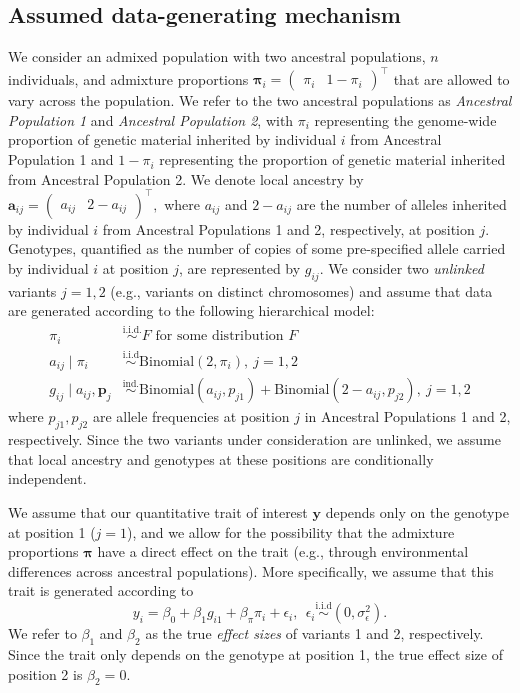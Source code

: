 \documentclass[12pt]{article}
\begin{document}
\subsection{Assumed data-generating mechanism}
\label{sec:datagen}

We consider an admixed population with two ancestral populations, $n$ individuals, and admixture proportions $\boldsymbol{\pi}_i = \begin{pmatrix} \pi_{i} & 1-\pi_{i} \end{pmatrix}^\top$ that are allowed to vary across the population. 
We refer to the two ancestral populations as \textit{Ancestral Population 1} and \textit{Ancestral Population 2}, with $\pi_i$ representing the genome-wide proportion of genetic material inherited by individual $i$ from Ancestral Population 1 and $1-\pi_i$ representing the proportion of genetic material inherited from Ancestral Population 2. 
We denote local ancestry by $\mathbf{a}_{ij} = \begin{pmatrix} a_{ij} & 2 - a_{ij} \end{pmatrix}^\top,$ where $a_{ij}$ and $2-a_{ij}$ are the number of alleles inherited by individual $i$ from Ancestral Populations 1 and 2, respectively, at position $j$.
Genotypes, quantified as the number of copies of some pre-specified allele carried by individual $i$ at position $j$, are represented by $g_{ij}$.
We consider two \textit{unlinked} variants $j = 1, 2$ (e.g., variants on distinct chromosomes) and assume that data are generated according to the following hierarchical model: 
\begin{align*}
\pi_i &\overset{\text{i.i.d.}}{\sim} F \text{ for some distribution } F\\
a_{ij} \mid \pi_i &\overset{\text{i.i.d}}{\sim} \text{Binomial}(2, \pi_i), \ j = 1, 2\\
g_{ij} \mid a_{ij}, \mathbf{p}_j &\overset{\text{ind.}}{\sim} \text{Binomial}(a_{ij}, p_{j1}) + \text{Binomial}(2-a_{ij}, p_{j2}), \ j = 1, 2 
\end{align*}
where $p_{j1}, p_{j2}$ are allele frequencies at position $j$ in Ancestral Populations 1 and 2, respectively. 
Since the two variants under consideration are unlinked, we assume that local ancestry and genotypes at these positions are conditionally independent.

We assume that our quantitative trait of interest $\mathbf{y}$ depends only on the genotype at position 1 ($j = 1$), and we allow for the possibility that the admixture proportions $\boldsymbol\pi$ have a direct effect on the trait (e.g., through environmental differences across ancestral populations). More specifically, we assume that this trait is generated according to $$y_i  = \beta_0 + \beta_1 g_{i1} + \beta_\pi \pi_i + \epsilon_i, \ \ \epsilon_i \overset{\text{i.i.d}}{\sim} (0, \sigma_\epsilon^2).$$
We refer to $\beta_1$ and $\beta_2$ as the true \textit{effect sizes} of variants 1 and 2, respectively. Since the trait only depends on the genotype at position 1, the true effect size of position 2 is $\beta_2 = 0$.
\end{document}
